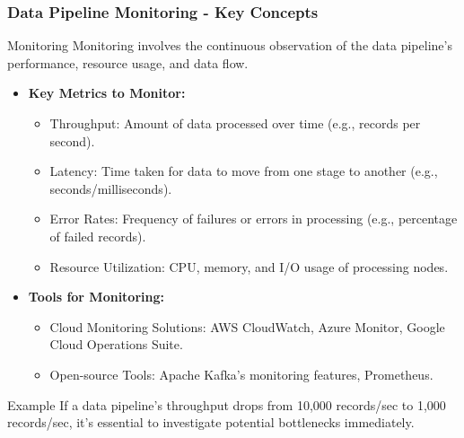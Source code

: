\documentclass[aspectratio=169]{beamer}
\begin{document}
\begin{frame}[fragile]
    \frametitle{Data Pipeline Monitoring - Key Concepts}
    \begin{block}{Monitoring}
        Monitoring involves the continuous observation of the data pipeline's performance, resource usage, and data flow.
    \end{block}
    
    \begin{itemize}
        \item \textbf{Key Metrics to Monitor:}
        \begin{itemize}
            \item Throughput: Amount of data processed over time (e.g., records per second).
            \item Latency: Time taken for data to move from one stage to another (e.g., seconds/milliseconds).
            \item Error Rates: Frequency of failures or errors in processing (e.g., percentage of failed records).
            \item Resource Utilization: CPU, memory, and I/O usage of processing nodes.
        \end{itemize}
        
        \item \textbf{Tools for Monitoring:}
        \begin{itemize}
            \item Cloud Monitoring Solutions: AWS CloudWatch, Azure Monitor, Google Cloud Operations Suite.
            \item Open-source Tools: Apache Kafka's monitoring features, Prometheus.
        \end{itemize}
    \end{itemize}
    
    \begin{block}{Example}
        If a data pipeline's throughput drops from 10,000 records/sec to 1,000 records/sec, it's essential to investigate potential bottlenecks immediately.
    \end{block}
\end{frame}
\end{document}
